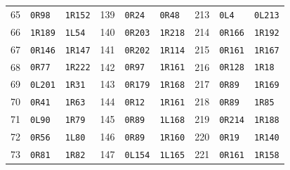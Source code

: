 \begin{longtable}{@{}rll@{\hspace{1.2em}}rll@{\hspace{1.2em}}rll@{}}
65 & \texttt{0R98} & \texttt{1R152} & 139 & \texttt{0R24} & \texttt{0R48} & 213 & \texttt{0L4} & \texttt{0L213}\\
66 & \texttt{1R189} & \texttt{1L54} & 140 & \texttt{0R203} & \texttt{1R218} & 214 & \texttt{0R166} & \texttt{1R192}\\
67 & \texttt{0R146} & \texttt{1R147} & 141 & \texttt{0R202} & \texttt{1R114} & 215 & \texttt{0R161} & \texttt{1R167}\\
68 & \texttt{0R77} & \texttt{1R222} & 142 & \texttt{0R97} & \texttt{1R161} & 216 & \texttt{0R128} & \texttt{1R18}\\
69 & \texttt{0L201} & \texttt{1R31} & 143 & \texttt{0R179} & \texttt{1R168} & 217 & \texttt{0R89} & \texttt{1R169}\\
70 & \texttt{0R41} & \texttt{1R63} & 144 & \texttt{0R12} & \texttt{1R161} & 218 & \texttt{0R89} & \texttt{1R85}\\
71 & \texttt{0L90} & \texttt{1R79} & 145 & \texttt{0R89} & \texttt{1L168} & 219 & \texttt{0R214} & \texttt{1R188}\\
72 & \texttt{0R56} & \texttt{1L80} & 146 & \texttt{0R89} & \texttt{1R160} & 220 & \texttt{0R19} & \texttt{1R140}\\
73 & \texttt{0R81} & \texttt{1R82} & 147 & \texttt{0L154} & \texttt{1L165} & 221 & \texttt{0R161} & \texttt{1R158}\\
\end{longtable}
\normalsize
